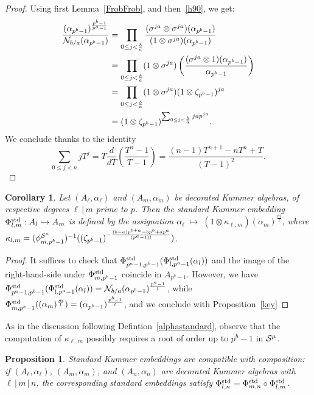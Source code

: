 \documentclass{sig-alternate}
\newtheorem{proposition}[theorem]{Proposition}
\newtheorem{corollary}[theorem]{Corollary}
\begin{document}
\begin{proof}
Using first Lemma~\ref{FrobFrob}, and then~\eqref{h90}, we get:
\begin{equation*}
\begin{split}
\frac{(\alpha_{p^b-1})^{\frac{p^b-1}{p^a-1}}}{\mathcal{N}_{b/a}(\alpha_{p^b-1})}&=\prod_{0\leq j<\frac{b}{a}}\frac{(\sigma^{ja}\otimes\sigma^{ja})(\alpha_{p^b-1})}{(1\otimes\sigma^{ja})(\alpha_{p^b-1})}\\
&=\prod_{0\leq j<\frac{b}{a}}(1\otimes\sigma^{ja})\left(\frac{(\sigma^{ja}\otimes 1)(\alpha_{p^b-1})}{\alpha_{p^b-1}}\right)\\
&=\prod_{0\leq j<\frac{b}{a}}(1\otimes\sigma^{ja})(1\otimes\zeta_{p^b-1})^{ja}\\
&=(1\otimes\zeta_{p^b-1})^{\sum_{0\leq j<\frac{b}{a}}jap^{ja}}.
\end{split}
\end{equation*}
We conclude thanks to the identity
\[ \sum_{0\leq j<n}jT^j=T\frac{d}{dT}\!\left(\frac{T^n-1}{T-1}\right)=\frac{(n-1)T^{n+1}-nT^n+T}{(T-1)^2}. \]
\end{proof}
\begin{corollary}
\label{explicit_general_standard_embedding}
Let $(A_\ell,\alpha_\ell)$ and $(A_m,\alpha_m)$ be decorated Kummer algebras,
of respective degrees $\ell\,|\,m$ prime to $p$.
Then the standard Kummer embedding ${\Phi^{\mathrm{std}}_{{l},{m}}}:A_l\hookrightarrow A_m$
is defined by the assignation
$\alpha_\ell\;\mapsto\;(1\otimes\kappa_{\ell,m})(\alpha_m)^{\frac{m}{\ell}}$, where
$\kappa_{l,m}=({\phi^{\mathcal{S}^\mu}_{{m},{p^b-1}}})^{-1}((\zeta_{p^b-1})^{-\frac{(b-a)p^{b+a}-bp^b+ap^a}{(p^a-1)l}})$.
\end{corollary}
\begin{proof}
It suffices to check that ${\Phi^{\mathrm{std}}_{{p^a-1},{p^b-1}}}({\Phi^{\mathrm{std}}_{{l},{p^a-1}}}(\alpha_l))$
and the image of the right-hand-side under ${\Phi^{\mathrm{std}}_{{m},{p^b-1}}}$ coincide in $A_{p^b-1}$.
However, we have ${\Phi^{\mathrm{std}}_{{p^a-1},{p^b-1}}}({\Phi^{\mathrm{std}}_{{l},{p^a-1}}}(\alpha_l))=\mathcal{N}_{b/a}(\alpha_{p^b-1})^{\frac{p^a-1}{l}}$,
while ${\Phi^{\mathrm{std}}_{{m},{p^b-1}}}((\alpha_m)^{\frac{m}{l}})=(\alpha_{p^b-1})^{\frac{p^b-1}{l}}$,
and we conclude with Proposition~\ref{key}
\end{proof}
As in the discussion following Defintion~\ref{alphastandard}, observe
that the computation of $\kappa_{\ell,m}$ possibly requires a root of order
up to $p^b-1$ in $\mathcal{S}^\mu$.
\begin{proposition}
\label{standard_K_embeddings_compatibles}
Standard Kummer embeddings are compatible with composition:
if $(A_\ell,\alpha_\ell)$, $(A_m,\alpha_m)$, and $(A_n,\alpha_n)$ are decorated Kummer algebras
with $\ell\,|\,m\,|\,n$, the corresponding standard embeddings
satisfy ${\Phi^{\mathrm{std}}_{{l},{n}}}={\Phi^{\mathrm{std}}_{{m},{n}}}\circ{\Phi^{\mathrm{std}}_{{l},{m}}}$.
\end{proposition}
\end{document}
